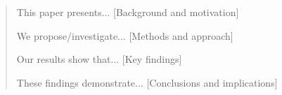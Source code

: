 \begin{abstract}

This paper presents... [Background and motivation]

We propose/investigate... [Methods and approach]

Our results show that... [Key findings]

These findings demonstrate... [Conclusions and implications]

\end{abstract}